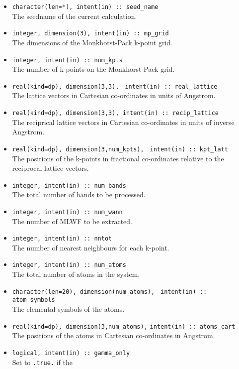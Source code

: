 \begin{itemize}
\item \verb#character(len=*), intent(in) :: seed_name#\\ The seedname
  of the current calculation.
\item \verb#integer, dimension(3), intent(in) :: mp_grid#\\ The
  dimensions of the {Monkhorst-Pack} k-point grid.
\item \verb#integer, intent(in) :: num_kpts#\\ The number of k-points on
  the {Monkhorst-Pack} grid.
\item \verb#real(kind=dp), dimension(3,3),#
      \verb# intent(in) :: real_lattice#\\ The lattice vectors in
      Cartesian co-ordinates in units of Angstrom.
\item \verb#real(kind=dp), dimension(3,3), intent(in) :: recip_lattice#\\
  The reciprical lattice vectors in Cartesian co-ordinates in units of inverse Angstrom.
\item \verb#real(kind=dp), dimension(3,num_kpts),#
      \verb# intent(in) :: kpt_latt#\\ The positions of the k-points in
      fractional co-ordinates relative to the reciprocal lattice
      vectors.
\item \verb#integer, intent(in) :: num_bands#\\ The total number of
      bands to be processed.
\item \verb#integer, intent(in) :: num_wann#\\ The number of MLWF to
  be extracted.
\item \verb#integer, intent(in) :: nntot#\\ The number of
  nearest neighbours for each k-point.
\item \verb#integer, intent(in) :: num_atoms#\\ The total number of atoms
  in the system.
\item \verb#character(len=20), dimension(num_atoms),#
      \verb# intent(in) :: atom_symbols#\\ The elemental symbols of
      the atoms.
\item \verb#real(kind=dp), dimension(3,num_atoms),#
      \verb#intent(in) :: atoms_cart#\\ The positions of the atoms in
      Cartesian co-ordinates in Angstrom.
\item \verb#logical, intent(in) :: gamma_only#\\ Set to \texttt{.true.} if the

\end{itemize}
